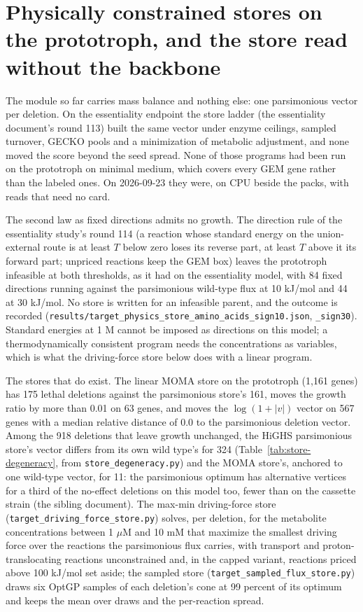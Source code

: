 \section{Physically constrained stores on the prototroph, and the store read without the backbone}
\label{sec:physics}

The module so far carries mass balance and nothing else: one parsimonious vector per
deletion. On the essentiality endpoint the store ladder (the essentiality document's
round 113) built the same vector under enzyme ceilings, sampled turnover, GECKO pools
and a minimization of metabolic adjustment, and none moved the score beyond the seed
spread. None of those programs had been run on the prototroph on minimal medium, which
covers every GEM gene rather than the labeled ones. On 2026-09-23 they were, on CPU
beside the packs, with reads that need no card.

The second law as fixed directions admits no growth. The direction rule of the
essentiality study's round 114 (a reaction whose standard energy on the union-external
route is at least $T$ below zero loses its reverse part, at least $T$ above it its
forward part; unpriced reactions keep the GEM box) leaves the prototroph infeasible at
both thresholds, as it had on the essentiality model, with 84 fixed directions running
against the parsimonious wild-type flux at 10 kJ/mol and 44 at 30 kJ/mol. No store is
written for an infeasible parent, and the outcome is recorded
(\texttt{results/target\_physics\_store\_amino\_acids\_sign10.json}, \texttt{\_sign30}).
Standard energies at 1 M cannot be imposed as directions on this model; a
thermodynamically consistent program needs the concentrations as variables, which is
what the driving-force store below does with a linear program.

The stores that do exist. The linear MOMA store on the prototroph (1,161 genes) has 175
lethal deletions against the parsimonious store's 161, moves the growth ratio by more
than 0.01 on 63 genes, and moves the $\log(1+|v|)$ vector on 567 genes with a median
relative distance of 0.0 to the parsimonious deletion vector. Among the 918 deletions
that leave growth unchanged, the HiGHS parsimonious store's vector differs from its own
wild type's for 324 (Table~\ref{tab:store-degeneracy}, from
\texttt{store\_degeneracy.py}) and the MOMA store's, anchored to one wild-type vector,
for 11: the parsimonious optimum has alternative vertices for a third of the no-effect
deletions on this model too, fewer than on the cassette strain (the sibling document).
The max-min driving-force store (\texttt{target\_driving\_force\_store.py}) solves, per
deletion, for the metabolite concentrations between 1 $\mu$M and 10 mM that maximize the
smallest driving force over the reactions the parsimonious flux carries, with transport
and proton-translocating reactions unconstrained and, in the capped variant, reactions
priced above 100 kJ/mol set aside; the sampled store
(\texttt{target\_sampled\_flux\_store.py}) draws six OptGP samples of each deletion's
cone at 99 percent of its optimum and keeps the mean over draws and the per-reaction
spread.

